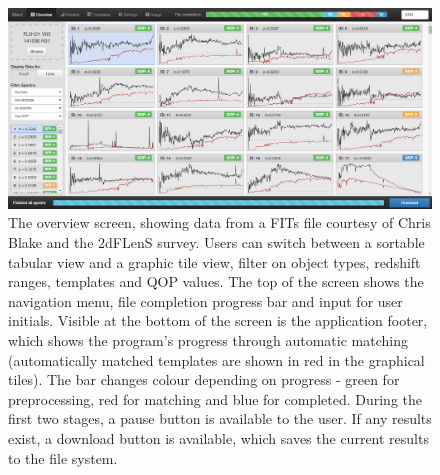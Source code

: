 \documentclass[iop]{emulateapj}
\begin{document}
\begin{figure}[H]
\centering
\includegraphics[width=\textwidth]{InterfaceZ.png}
\caption{The overview screen, showing data from a FITs file courtesy of Chris Blake and the 2dFLenS survey. Users can switch between a sortable tabular view and a graphic tile view, filter on object types, redshift ranges, templates and QOP values. The top of the screen shows the navigation menu, file completion progress bar and input for user initials. Visible at the bottom of the screen is the application footer, which shows the program's progress through automatic matching (automatically matched templates are shown in red in the graphical tiles). The bar changes colour depending on progress - green for preprocessing, red for matching and blue for completed. During the first two stages, a pause button is available to the user. If any results exist, a download button is available, which saves the current results to the file system.}
\label{fig:overview}
\end{figure}
\end{document}
